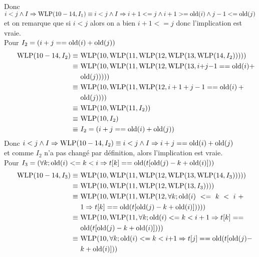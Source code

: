 \documentclass[11pt,answers]{exam}
\begin{document}
\begin{questions}
\begin{parts}
\begin{solutionorbox}
\begin{align*}
      \end{align*}
      Donc $i < j \land I \Rightarrow \mathrm{WLP}(10-14,I_1)\\
      \equiv i < j \land I \Rightarrow i+1 <= j \wedge i+1 >= \mathrm{old}(i) \wedge j-1 <= \mathrm{old}(j) $\\
      et on remarque que si $i<j$ alors on a bien $i+1<=j$ donc l'implication est vraie.\\
      Pour $I_2 = (i + j == \mathrm{old}(i) + \mathrm{old}(j))$
      \begin{align*}
        \WLP(10-14,I_2) \equiv & ~\breaktowidth{8.2cm}{\WLP(10, \WLP(11, \WLP(12, \WLP(13, \WLP(14, I_2)))))}\\
        \equiv               & ~\breaktowidth{8.2cm}{\WLP(10, \WLP(11, \WLP(12, \WLP(13, i + j-1 == \old(i) + \old(j)))))}\\
        \equiv               & ~\breaktowidth{8.2cm}{\WLP(10, \WLP(11, \WLP(12, i+1 + j-1 == \old(i) + \old(j))))}\\
        \equiv               & ~\breaktowidth{8.2cm}{\WLP(10, \WLP(11, I_2))}\\
        \equiv               & ~\breaktowidth{8.2cm}{\WLP(10, I_2)}\\
        \equiv               & ~\breaktowidth{8.2cm}{I_2 = (i + j == \old(i) + \old(j))}
      \end{align*}
      Donc $i < j \land I \Rightarrow \mathrm{WLP}(10-14,I_2)\\
      \equiv i < j \land I \Rightarrow i + j == \mathrm{old}(i) + \mathrm{old}(j) $\\
      et comme $I_2$ n'a pas changé par définition, alors l'implication est vraie.\\
      Pour $I_3 = (\forall k; \mathrm{old}(i) <= k < i \Rightarrow t[k] == \mathrm{old}(t[\mathrm{old}(j)-k+\mathrm{old}(i)]))$
      \begin{align*}
        \WLP(10-14,I_3) \equiv & ~\breaktowidth{8.2cm}{\WLP(10, \WLP(11, \WLP(12, \WLP(13, \WLP(14, I_3)))))}\\
        \equiv               & ~\breaktowidth{8.2cm}{\WLP(10, \WLP(11, \WLP(12, \WLP(13, I_3))))}\\
        \equiv               & ~\breaktowidth{8.2cm}{\WLP(10, \WLP(11, \WLP(12, \forall k; \old(i) <= k < i+1 \Rightarrow t[k] == \old(t[\old(j)-k+\old(i)]))))}\\
        \equiv               & ~\breaktowidth{8.2cm}{\WLP(10, \WLP(11, \forall k; \old(i) <= k < i+1 \Rightarrow t[k] == \old(t[\old(j)-k+\old(i)])))}\\
        \equiv               & ~\breaktowidth{8.2cm}{\WLP(10, \forall k; \old(i) <= k < i+1 \Rightarrow t[j] == \old(t[\old(j)-k+\old(i)]))}\\

\end{align*}
\end{solutionorbox}
\end{parts}
\end{questions}
\end{document}
